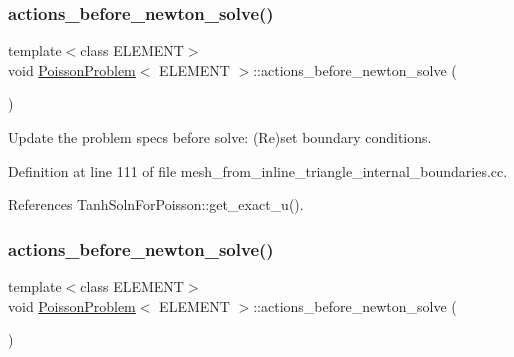 \mbox{\label{classPoissonProblem_a398608a5ff73b74c5a387b3f794c58df}} 
\subsubsection{\texorpdfstring{actions\+\_\+before\+\_\+newton\+\_\+solve()}{actions\_before\_newton\_solve()}\hspace{0.1cm}{\footnotesize\ttfamily [1/2]}}
{\footnotesize\ttfamily template$<$class E\+L\+E\+M\+E\+NT$>$ \\
void \hyperlink{classPoissonProblem}{Poisson\+Problem}$<$ E\+L\+E\+M\+E\+NT $>$\+::actions\+\_\+before\+\_\+newton\+\_\+solve (\begin{DoxyParamCaption}{ }\end{DoxyParamCaption})\hspace{0.3cm}{\ttfamily [inline]}}



Update the problem specs before solve\+: (Re)set boundary conditions. 



Definition at line 111 of file mesh\+\_\+from\+\_\+inline\+\_\+triangle\+\_\+internal\+\_\+boundaries.\+cc.



References Tanh\+Soln\+For\+Poisson\+::get\+\_\+exact\+\_\+u().

\mbox{\label{classPoissonProblem_a398608a5ff73b74c5a387b3f794c58df}} 
\subsubsection{\texorpdfstring{actions\+\_\+before\+\_\+newton\+\_\+solve()}{actions\_before\_newton\_solve()}\hspace{0.1cm}{\footnotesize\ttfamily [2/2]}}
{\footnotesize\ttfamily template$<$class E\+L\+E\+M\+E\+NT$>$ \\
void \hyperlink{classPoissonProblem}{Poisson\+Problem}$<$ E\+L\+E\+M\+E\+NT $>$\+::actions\+\_\+before\+\_\+newton\+\_\+solve (\begin{DoxyParamCaption}{ }\end{DoxyParamCaption})\hspace{0.3cm}{\ttfamily [inline]}}




